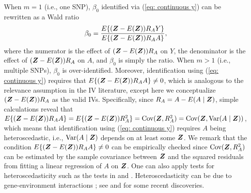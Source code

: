 \documentclass[12pt]{article}
\begin{document}
When $ m=1 $ (i.e., one SNP),   $ \beta_0 $ identified via (\ref{eq: continuous y})  can be rewritten as a Wald ratio
\begin{align}
	\beta_0= \frac{E\{ (\bm{Z}-E(\bm{Z})) R_A Y\}}{E\{ (\bm{Z}- E(\bm{Z}))R_A A\}}, \nonumber
\end{align}
where the numerator is the effect of $ (\bm{Z}-E(\bm{Z})) R_A$ on $ Y $, the denominator is the effect of $ (\bm{Z}-E(\bm{Z})) R_A$ on $ A $, and $ \beta_0 $ is simply the ratio. When $ m>1 $ (i.e., multiple SNPs), $ \beta_0 $ is over-identified. Moreover, identification using (\ref{eq: continuous y}) requires that  $ E\{ (\bm{Z}- E(\bm{Z})) R_AA \} \neq 0$, which is analogous to the relevance assumption in the IV literature, except here we conceptualize $ (\bm{Z}- E(\bm{Z})) R_A  $ as the valid IVs. Specifically, since $ R_A= A- E(A\mid\bm{Z}) $, simple calculations reveal that $ E\{ (\bm{Z}- E(\bm{Z})) R_AA \}=E\{ (\bm{Z}- E(\bm{Z})) R_A^2\}= \mbox{Cov} (\bm{Z}, R_A^2)= \mbox{Cov} (\bm{Z}, \mbox{Var}(A\mid\bm{Z}))$, which means that identification using  (\ref{eq: continuous y}) requires $ A $ being heteroscedastic, i.e., $ \mbox{Var}(A\mid\bm{Z}) $ depends on  at least some $ \bm{Z} $.  We remark that the condition  $ E\{ (\bm{Z}- E(\bm{Z})) R_AA \} \neq 0$ can be empirically checked since $ \mbox{Cov} (\bm{Z}, R_A^2) $ can be estimated by the sample covariance between $ \bm{Z} $ and the squared residuals from fitting a linear regression of $ A $ on $ \bm{Z} $.  One can also apply tests for heteroscedasticity such as the tests in  \cite{KOENKER1981} and \cite{White:1980heterosce}. {Heteroscedasticity can be due to gene-environment interactions \citep{pare2010use}; see \cite{wang2019genotype} and \cite{sulc2020quantification} for some recent discoveries.
}





\end{document}
